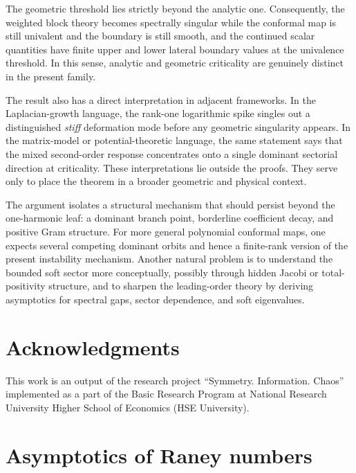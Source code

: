 \documentclass[11pt]{amsart}
\numberwithin{equation}{section}
\theoremstyle{plain}
\theoremstyle{definition}
\theoremstyle{remark}
\begin{document}
The geometric threshold lies strictly beyond the analytic one. Consequently,
the weighted block theory becomes spectrally singular while the conformal map
is still univalent and the boundary is still smooth, and the continued scalar
quantities have finite upper and lower lateral boundary values at the univalence
threshold. In this sense, analytic and geometric criticality are genuinely
distinct in the present family.

The result also has a direct interpretation in adjacent frameworks. In the
Laplacian-growth language, the rank-one logarithmic spike singles out a
distinguished \emph{stiff} deformation mode before any geometric singularity
appears. In the matrix-model or potential-theoretic language, the same
statement says that the mixed second-order response concentrates onto a single
dominant sectorial direction at criticality. These interpretations lie outside the proofs. They serve only to place the theorem in a broader geometric and physical context.




The argument isolates a structural mechanism that should persist beyond the
one-harmonic leaf: a dominant branch point, borderline coefficient decay, and
positive Gram structure. For more general polynomial conformal maps, one
expects several competing dominant orbits and hence a finite-rank version of
the present instability mechanism. Another natural problem is to understand
the bounded soft sector more conceptually, possibly through hidden Jacobi or
total-positivity structure, and to sharpen the leading-order theory by
deriving asymptotics for spectral gaps, sector dependence, and soft
eigenvalues.


\section*{Acknowledgments}


This work is an output of the research project
``Symmetry. Information. Chaos''
implemented as a part of the Basic Research Program at
National Research University Higher School
of Economics (HSE University).

% 

\appendix

\section{Asymptotics of Raney numbers}
\label{app:raney-asymp}
\end{document}

